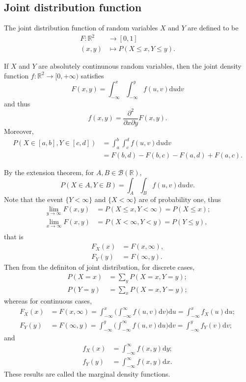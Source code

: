 \documentclass[11pt,singlecolumn, openany, citestyle=authoryear]{elegantbook}
\begin{document}
\begin{CJK}{UTF8}{gbsn}
\section{Joint distribution function}
The joint distribution function of random variables $X$ and $Y$ are defined to be 
\begin{align*}
    F: \mathbb{R}^2&\longrightarrow [0,1]\\
    (x,y)&\longmapsto P(X\leqslant x,Y\leqslant y).
\end{align*}
\begin{definition}
    If $X$ and $Y$ are absolutely continunous random variables, then the joint density 
    function $f:\mathbb{R}^2\to [0,+\infty)$ satisfies 
    $$
    F(x,y)=\int_{-\infty}^x \int_{-\infty}^y f(u,v)\mathrm{d}u\mathrm{d}v
    $$
    and thus 
    $$
    f(x,y)=\frac{\partial^2}{\partial x \partial y}F(x,y).
    $$
    Moreover,
    \begin{align*}
    P(X\in[a,b],Y\in[c,d])&=\int_{a}^b \int_{c}^d f(u,v)\mathrm{d}u\mathrm{d}v\\
    &=F(b,d)-F(b,c)-F(a,d)+F(a,c).
    \end{align*}
\end{definition}
By the extension theorem, for $A,B\in\mathcal{B}(\mathbb{R})$,
$$
P(X\in A, Y\in B)=\int_A \int_B f(u,v)\mathrm{d}u\mathrm{d}v.
$$
Note that the event $\{Y<\infty\}$ and $\{X<\infty\}$ are of probability one, thus 
\begin{align*}
    \lim_{y\to\infty} F(x,y)&=P(X\leqslant x, Y<\infty) = P(X\leqslant x);\\
    \lim_{x\to\infty} F(x,y)&=P(X< \infty, Y<y) = P(Y\leqslant y),\\
\end{align*}
that is 
\begin{align*}
F_X(x)&=F(x,\infty),\\
F_Y(y)&=F(\infty,y).
\end{align*}
Then from the definiton of joint distribution, for discrete cases, 
\begin{align*}
    P(X=x)&=\sum_{y} P(X=x,Y=y);\\
    P(Y=y)&=\sum_{x} P(X=x,Y=y);
\end{align*}
whereas for continuous cases,
\begin{align*}
    F_X(x)&=F(x,\infty)=\int_{-\infty}^x \biggl(
        \int_{-\infty}^\infty f(u,v)\mathrm{d}v
    \biggr)\mathrm{d}u = \int_{-\infty}^x f_X(u)\mathrm{d}u;\\
    F_Y(y)&=F(\infty,y)=\int_{-\infty}^y \biggl(
        \int_{-\infty}^\infty f(u,v)\mathrm{d}u
    \biggr)\mathrm{d}v = \int_{-\infty}^y f_Y(v)\mathrm{d}v;
\end{align*}
and 
\begin{align*}
    f_X(x)&=\int_{-\infty}^\infty f(x,y)\mathrm{d}y;\\
    f_Y(y)&=\int_{-\infty}^\infty f(x,y)\mathrm{d}x.
\end{align*}
These results are called the marginal density functions.


\end{CJK}
\end{document}

